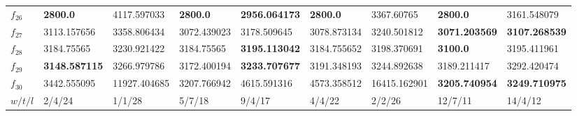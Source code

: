 \begin{table*}[t!]
\begin{tabular}{|p{0.8cm}|p{1.6cm}|p{1.6cm}|p{1.6cm}|p{1.6cm}|p{1.6cm}|p{1.6cm}|p{1.6cm}|p{1.6cm}|}
$f_{26}$  & \textbf{2800.0} & 4117.597033 & \textbf{2800.0} & \textbf{2956.064173} & \textbf{2800.0} & 3367.60765 & \textbf{2800.0} & 3161.548079 \\ 
$f_{27}$  & 3113.157656 & 3358.806434 & 3072.439023 & 3178.509645 & 3078.873134 & 3240.501812 & \textbf{3071.203569} & \textbf{3107.268539} \\ 
$f_{28}$  & 3184.75565 & 3230.921422 & 3184.75565 & \textbf{3195.113042} & 3184.755652 & 3198.370691 & \textbf{3100.0} & 3195.411961 \\ 
$f_{29}$  & \textbf{3148.587115} & 3266.979786 & 3172.400194 & \textbf{3233.707677} & 3191.348193 & 3244.892638 & 3189.211417 & 3292.420474 \\ 
$f_{30}$  & 3442.555095 & 11927.404685 & 3207.766942 & 4615.591316 & 4573.358512 & 16415.162901 & \textbf{3205.740954} & \textbf{3249.710975} \\
\hline
$w/t/l$  & 2/4/24 & 1/1/28 & 5/7/18 & 9/4/17 & 4/4/22 & 2/2/26 & 12/7/11 & 14/4/12 \\
\hline

\end{tabular}
\end{table*}

